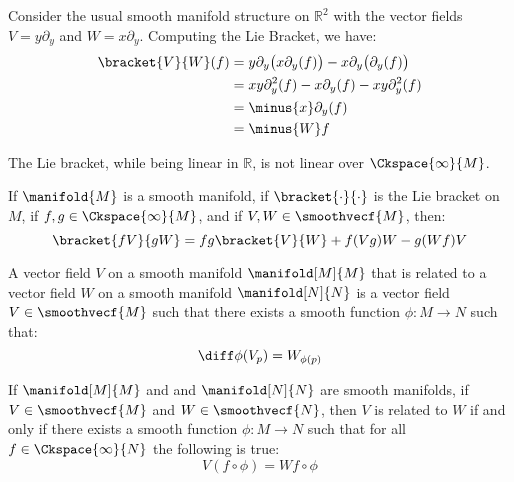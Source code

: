 \documentclass{article}                                                        %
\begin{document}
            \begin{example}
                Consider the usual smooth manifold structure on $\mathbb{R}^{2}$
                with the vector fields $V=y\partial_{y}$ and
                $W=x\partial_{y}$. Computing the Lie Bracket, we have:
                \begin{align}
                    \bracket{V}{W}(f)
                    &=y\partial_{y}\big(x\partial_{y}(f)\big)
                        -x\partial_{y}\big(\partial_{y}(f)\big)\\
                    &=xy\partial_{y}^{2}(f)-x\partial_{y}(f)
                        -xy\partial_{y}^{2}(f)\\
                    &=\minus{x}\partial_{y}(f)\\
                    &=\minus{W}f
                \end{align}
            \end{example}
            The Lie bracket, while being linear in $\mathbb{R}$, is not linear
            over $\Ckspace{\infty}{M}$.
            \begin{theorem}
                If $\manifold{M}$ is a smooth manifold, if
                $\bracket{\cdot}{\cdot}$ is the Lie bracket on $M$, if
                $f,g\in\Ckspace{\infty}{M}$, and if $V,W\in\smoothvecf{M}$,
                then:
                \begin{equation}
                    \bracket{fV}{gW}=fg\bracket{V}{W}+f(Vg)W-g(Wf)V
                \end{equation}
            \end{theorem}
            \begin{definition}
                A vector field $V$ on a smooth manifold $\manifold[M]{M}$ that
                is related to a vector field $W$ on a smooth manifold
                $\manifold[N]{N}$ is a vector field $V\in\smoothvecf{M}$ such
                that there exists a smooth function $\phi:M\rightarrow{N}$ such
                that:
                \begin{equation}
                    \diff\phi(V_{p})=W_{\phi(p)}
                \end{equation}
            \end{definition}
            \begin{theorem}
                If $\manifold[M]{M}$ and and $\manifold[N]{N}$ are smooth
                manifolds, if $V\in\smoothvecf{M}$ and $W\in\smoothvecf{N}$,
                then $V$ is related to $W$ if and only if there exists a
                smooth function $\phi:M\rightarrow{N}$ such that for all
                $f\in\Ckspace{\infty}{N}$ the following is true:
                \begin{equation}
                    V(f\circ\phi)=Wf\circ\phi
                \end{equation}
            \end{theorem}
\end{document}
